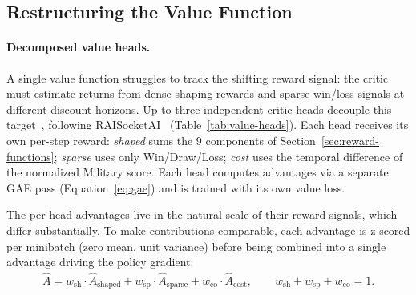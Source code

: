 \subsection*{Restructuring the Value Function}

\paragraph{Decomposed value heads.}
\label{sec:value-heads}

A single value function struggles to track the shifting reward signal: the critic must estimate returns from dense shaping rewards and sparse win/loss signals at different discount horizons. Up to three independent critic heads decouple this target~\cite{vanseijenHybridRewardArchitecture2017}, following RAISocketAI~\cite{goodfriendCompetitionWinningDeep2024} (Table~\ref{tab:value-heads}). Each head receives its own per-step reward: \emph{shaped} sums the $9$ components of Section~\ref{sec:reward-functions}; \emph{sparse} uses only Win/Draw/Loss; \emph{cost} uses the temporal difference of the normalized Military score. Each head computes advantages via a separate GAE pass (Equation~\ref{eq:gae}) and is trained with its own value loss.

The per-head advantages live in the natural scale of their reward signals, which differ substantially. To make contributions comparable, each advantage is z-scored per minibatch (zero mean, unit variance) before being combined into a single advantage driving the policy gradient:
\begin{align}
\hat{A} = w_{\text{sh}} \cdot \hat{A}_{\text{shaped}}
        + w_{\text{sp}} \cdot \hat{A}_{\text{sparse}}
        + w_{\text{co}} \cdot \hat{A}_{\text{cost}},
\qquad w_{\text{sh}} + w_{\text{sp}} + w_{\text{co}} = 1.
\end{align}

